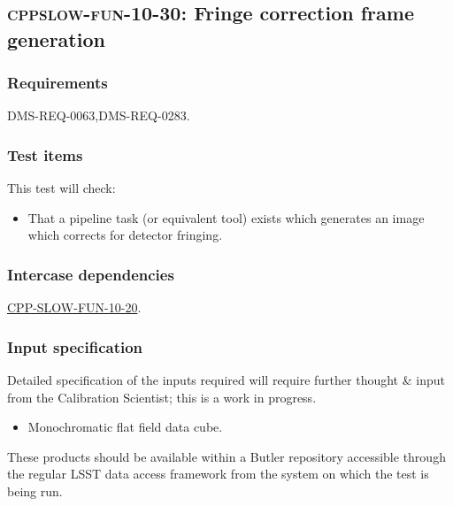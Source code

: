 \subsection{\textsc{cppslow-fun-10-30}: Fringe correction frame generation}
\label{cppslow-fun-10-30}

\subsubsection{Requirements}

DMS-REQ-0063,DMS-REQ-0283.

\subsubsection{Test items}

This test will check:

\begin{itemize}

  \item{That a pipeline task (or equivalent tool) exists which generates an
  image which corrects for detector fringing.}

\end{itemize}

\subsubsection{Intercase dependencies}

\hyperref[cppslow-fun-10-20]{CPP-SLOW-FUN-10-20}.

\subsubsection{Input specification}

\begin{note}
Detailed specification of the inputs required will require further thought \&
input from the Calibration Scientist; this is a work in progress.
\end{note}

\begin{itemize}

  \item{Monochromatic flat field data cube.}

\end{itemize}

These products should be available within a Butler repository accessible
through the regular LSST data access framework from the system on which the test
is being run.

